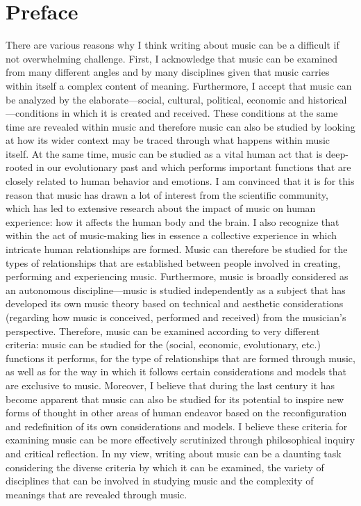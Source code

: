 \chapter*{Preface}

There are various reasons why I think writing about music can be a difficult if not overwhelming challenge. First, I acknowledge that music can be examined from many different angles and by many disciplines given that music carries within itself a complex content of meaning. Furthermore, I accept that music can be analyzed by the elaborate---social, cultural, political, economic and historical---conditions in which it is created and received. These conditions at the same time are revealed within music and therefore music can also be studied by looking at how its wider context may be traced through what happens within music itself. At the same time, music can be studied as a vital human act that is deep-rooted in our evolutionary past and which performs important functions that are closely related to human behavior and emotions. I am convinced that it is for this reason that music has drawn a lot of interest from the scientific community, which has led to extensive research about the impact of music on human experience: how it affects the human body and the brain. I also recognize that within the act of music-making lies in essence a collective experience in which intricate human relationships are formed. Music can therefore be studied for the types of relationships that are established between people involved in creating, performing and experiencing music. Furthermore, music is broadly considered as an autonomous discipline---music is studied independently as a subject that has developed its own music theory based on technical and aesthetic considerations (regarding how music is conceived, performed and received) from the musician's perspective. Therefore, music can be examined according to very different criteria: music can be studied for the (social, economic, evolutionary, etc.) functions it performs, for the type of relationships that are formed through music, as well as for the way in which it follows certain considerations and models that are exclusive to music. Moreover, I believe that during the last century it has become apparent that music can also be studied for its potential to inspire new forms of thought in other areas of human endeavor based on the reconfiguration and redefinition of its own considerations and models. I believe these criteria for examining music can be more effectively scrutinized through philosophical inquiry and critical reflection. In my view, writing about music can be a daunting task considering the diverse criteria by which it can be examined, the variety of disciplines that can be involved in studying music and the complexity of meanings that are revealed through music.

